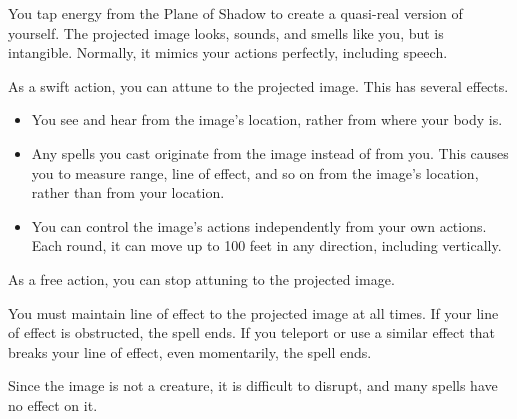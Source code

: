 \begin{spellheader}
    \spellrng{\rngmed}
\end{spellheader}
\begin{spellcontent}
    \spelleffect You tap energy from the Plane of Shadow to create a quasi-real version of yourself. The projected image looks, sounds, and smells like you, but is intangible. Normally, it mimics your actions perfectly, including speech.
    \par As a swift action, you can attune to the projected image. This has several effects.
    \begin{itemize}
        \item You see and hear from the image's location, rather from where your body is.
        \item Any spells you cast originate from the image instead of from you. This causes you to measure range, line of effect, and so on from the image's location, rather than from your location.
        \item You can control the image's actions independently from your own actions. Each round, it can move up to 100 feet in any direction, including vertically.
    \end{itemize}

    As a free action, you can stop attuning to the projected image.

    \spelldur{\durmed \dismissable}
\end{spellcontent}
\begin{spellfooter}
    \spellnotes You must maintain line of effect to the projected image at all times. If your line of effect is obstructed, the spell ends. If you teleport or use a similar effect that breaks your line of effect, even momentarily, the spell ends.

    Since the image is not a creature, it is difficult to disrupt, and many spells have no effect on it.
\end{spellfooter}

